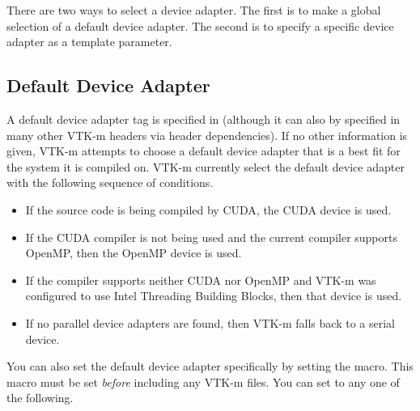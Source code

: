 There are two ways to select a device adapter. The first is to make a
global selection of a default device adapter. The second is to specify a
specific device adapter as a template parameter.

\subsection{Default Device Adapter}
\label{sec:DefaultDeviceAdapter}

A default device adapter tag is specified in
 (although it can also by specified
in many other VTK-m headers via header dependencies). If no other
information is given, VTK-m attempts to choose a default device adapter
that is a best fit for the system it is compiled on. VTK-m currently select
the default device adapter with the following sequence of conditions.

\begin{itemize}
\item {} If the source code is being compiled by CUDA, the CUDA
  device is used.
\item {} If the CUDA compiler is not being used and the current
  compiler supports OpenMP, then the OpenMP device is used.
\item {}  If the compiler
  supports neither CUDA nor OpenMP and VTK-m was configured to use Intel
  Threading Building Blocks, then that device is used.
\item {} If no parallel device adapters are found, then VTK-m
  falls back to a serial device.
\end{itemize}

You can also set the default device adapter specifically by setting the
 macro. This macro must be set
\emph{before} including any VTK-m files. You can set
 to any one of the following.

